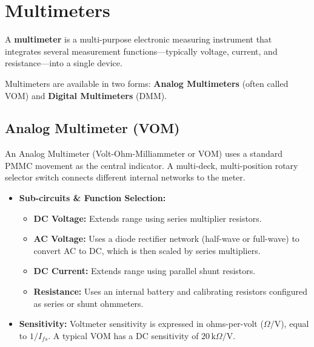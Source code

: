 \documentclass[12pt,a4paper]{article}
\begin{document}
\section{Multimeters}

\begin{tcolorbox}[defbox, title={\textbf{Multimeter}}]
A \textbf{multimeter} is a multi-purpose electronic measuring instrument that integrates several measurement functions---typically voltage, current, and resistance---into a single device.
\end{tcolorbox}

Multimeters are available in two forms: \textbf{Analog Multimeters} (often called VOM) and \textbf{Digital Multimeters} (DMM).

\subsection{Analog Multimeter (VOM)}
An Analog Multimeter (Volt-Ohm-Milliammeter or VOM) uses a standard PMMC movement as the central indicator. A multi-deck, multi-position rotary selector switch connects different internal networks to the meter.

\begin{itemize}[leftmargin=*, itemsep=3.5pt]
  \item \textbf{Sub-circuits \& Function Selection:}
    \begin{itemize}[leftmargin=*, itemsep=2.5pt, topsep=0pt]
      \item \textbf{DC Voltage:} Extends range using series multiplier resistors.
      \item \textbf{AC Voltage:} Uses a diode rectifier network (half-wave or full-wave) to convert AC to DC, which is then scaled by series multipliers.
      \item \textbf{DC Current:} Extends range using parallel shunt resistors.
      \item \textbf{Resistance:} Uses an internal battery and calibrating resistors configured as series or shunt ohmmeters.
    \end{itemize}
  \item \textbf{Sensitivity:} Voltmeter sensitivity is expressed in ohms-per-volt ($\Omega/\text{V}$), equal to $1 / I_{fs}$. A typical VOM has a DC sensitivity of $20\,\text{k}\Omega/\text{V}$.
\end{itemize}
\end{document}
